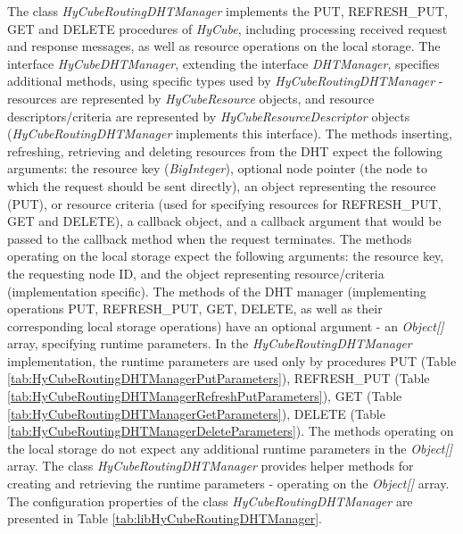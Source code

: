 The class \emph{HyCubeRoutingDHTManager} implements the PUT, REFRESH\_PUT, GET and DELETE procedures of \emph{HyCube}, including processing received request and response messages, as well as resource operations on the local storage. The interface \emph{HyCubeDHTManager}, extending the interface \emph{DHTManager}, specifies additional methods, using specific types used by \emph{HyCubeRoutingDHTManager} - resources are represented by \emph{HyCubeResource} objects, and resource descriptors/criteria are represented by \emph{HyCubeResourceDescriptor} objects (\emph{HyCubeRoutingDHTManager} implements this interface). The methods inserting, refreshing, retrieving and deleting resources from the DHT expect the following arguments: the resource key (\emph{BigInteger}), optional node pointer (the node to which the request should be sent directly), an object representing the resource (PUT), or resource criteria (used for specifying resources for REFRESH\_PUT, GET and DELETE), a callback object, and a callback argument that would be passed to the callback method when the request terminates. The methods operating on the local storage expect the following arguments: the resource key, the requesting node ID, and the object representing resource/criteria (implementation specific). The methods of the DHT manager (implementing operations PUT, REFRESH\_PUT, GET, DELETE, as well as their corresponding local storage operations) have an optional argument - an \emph{Object[]} array, specifying runtime parameters. In the \emph{HyCubeRoutingDHTManager} implementation, the runtime parameters are used only by procedures PUT (Table \ref{tab:HyCubeRoutingDHTManagerPutParameters}), REFRESH\_PUT (Table \ref{tab:HyCubeRoutingDHTManagerRefreshPutParameters}), GET (Table \ref{tab:HyCubeRoutingDHTManagerGetParameters}), DELETE (Table \ref{tab:HyCubeRoutingDHTManagerDeleteParameters}). The methods operating on the local storage do not expect any additional runtime parameters in the \emph{Object[]} array. The class \emph{HyCubeRoutingDHTManager} provides helper methods for creating and retrieving the runtime parameters - operating on the \emph{Object[]} array. The configuration properties of the class \emph{HyCubeRoutingDHTManager} are presented in Table \ref{tab:libHyCubeRoutingDHTManager}.


